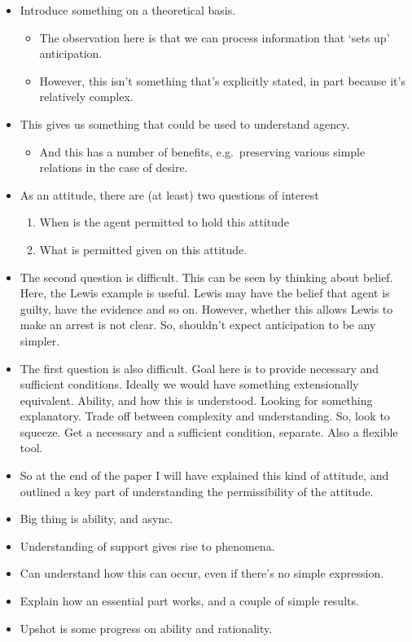 \documentclass[10pt]{article}
\begin{document}
\begin{itemize}
\item Introduce something on a theoretical basis.
  \begin{itemize}
  \item The observation here is that we can process information that `sets up' anticipation.
  \item However, this isn't something that's explicitly stated, in part because it's relatively complex.
  \end{itemize}
\item This gives us something that could be used to understand agency.
  \begin{itemize}
  \item And this has a number of benefits, e.g.\ preserving various simple relations in the case of desire.
  \end{itemize}
\item As an attitude, there are (at least) two questions of interest
  \begin{enumerate}
  \item When is the agent permitted to hold this attitude
  \item What is permitted given on this attitude.
  \end{enumerate}
\item The second question is difficult.
  This can be seen by thinking about belief.
  Here, the Lewis example is useful.
  Lewis may have the belief that agent is guilty, have the evidence and so on.
  However, whether this allows Lewis to make an arrest is not clear.
  So, shouldn't expect anticipation to be any simpler.
\item The first question is also difficult.
  Goal here is to provide necessary and sufficient conditions.
  Ideally we would have something extensionally equivalent.
  Ability, and how this is understood.
  Looking for something explanatory.
  Trade off between complexity and understanding.
  So, look to squeeze.
  Get a necessary and a sufficient condition, separate.
  Also a flexible tool.
\item So at the end of the paper I will have explained this kind of attitude, and outlined a key part of understanding the permissibility of the attitude.
\item Big thing is ability, and async.
\end{itemize}

\begin{itemize}
\item Understanding of support gives rise to phenomena.
\item Can understand how this can occur, even if there's no simple expression.
\item Explain how an essential part works, and a couple of simple results.
\item Upshot is some progress on ability and rationality.
\end{itemize}
\end{document}
